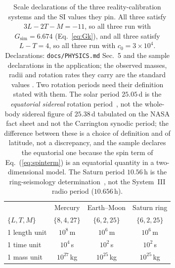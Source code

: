 \documentclass[aps,reprint,amsmath,amssymb,nofootinbib,superscriptaddress,floatfix]{revtex4-2}
\begin{document}
{\squeezetable
\begin{table}[t]
\caption{Scale declarations of the three reality-calibration systems
  and the SI values they pin. All three satisfy $3L-2T-M=-11$, so all
  three run with $G_{\mathrm{sim}}=6.674$
  (Eq.~\ref{eq:Gk}), and all three satisfy $L-T=4$, so all three run
  with $c_0=3\times10^{4}$. Declarations: \texttt{docs/PHYSICS.md}
  Sec.~5 and the sample declarations in the application; the observed
  masses, radii and rotation rates they carry are the standard values
  \cite{Prsa2016,NASAFact,Mankovich2019}. Two rotation periods need
  their definition stated with them. The solar period $25.05$\,d is the
  \emph{equatorial sidereal} rotation period~\cite{SnodgrassUlrich1990},
  not the whole-body
  sidereal figure of $25.38$\,d tabulated on the NASA fact sheet and not
  the Carrington synodic period; the difference between these is a
  choice of definition and of latitude, not a discrepancy, and the
  sample declares the equatorial one because the spin term of
  Eq.~(\ref{eq:spinterm}) is an equatorial quantity in a
  two-dimensional model. The Saturn period $10.56$\,h is the
  ring-seismology determination~\cite{Mankovich2019}, not the
  System~III radio period ($10.656$\,h).}
\label{tab:scales}
\begin{ruledtabular}
\begin{tabular}{lccc}
 & Mercury & Earth--Moon & Saturn ring \\
\colrule
$\{L,T,M\}$ & $\{8,4,27\}$ & $\{6,2,25\}$ & $\{6,2,25\}$ \\
1 length unit & $10^{8}$\,m & $10^{6}$\,m & $10^{6}$\,m \\
1 time unit & $10^{4}$\,s & $10^{2}$\,s & $10^{2}$\,s \\
1 mass unit & $10^{27}$\,kg & $10^{25}$\,kg & $10^{25}$\,kg \\

\end{tabular}
\end{ruledtabular}
\end{table}}
\end{document}
